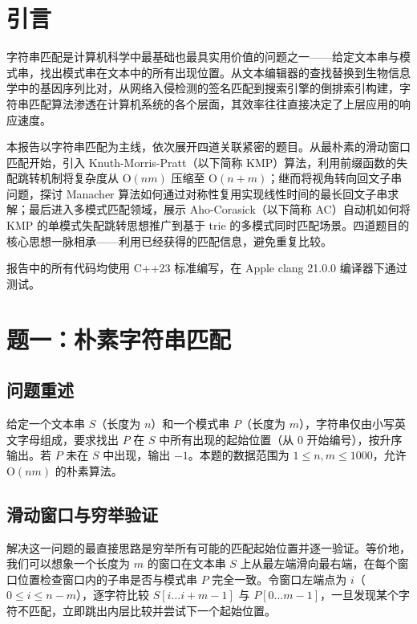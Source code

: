 \documentclass[12pt, a4paper]{academics}
\begin{document}
\makeacademicscover

\section{引言}

字符串匹配是计算机科学中最基础也最具实用价值的问题之一——给定文本串与模式串，找出模式串在文本中的所有出现位置。从文本编辑器的查找替换到生物信息学中的基因序列比对，从网络入侵检测的签名匹配到搜索引擎的倒排索引构建，字符串匹配算法渗透在计算机系统的各个层面，其效率往往直接决定了上层应用的响应速度。

本报告以字符串匹配为主线，依次展开四道关联紧密的题目。从最朴素的滑动窗口匹配开始，引入 Knuth-Morris-Pratt（以下简称 KMP）算法，利用前缀函数的失配跳转机制将复杂度从 $\mathrm{O}(nm)$ 压缩至 $\mathrm{O}(n + m)$；继而将视角转向回文子串问题，探讨 Manacher 算法如何通过对称性复用实现线性时间的最长回文子串求解；最后进入多模式匹配领域，展示 Aho-Corasick（以下简称 AC）自动机如何将 KMP 的单模式失配跳转思想推广到基于 trie 的多模式同时匹配场景。四道题目的核心思想一脉相承——利用已经获得的匹配信息，避免重复比较。

报告中的所有代码均使用 C++23 标准编写，在 Apple clang 21.0.0 编译器下通过测试。

\section{题一：朴素字符串匹配}

\subsection{问题重述}

给定一个文本串 $S$（长度为 $n$）和一个模式串 $P$（长度为 $m$），字符串仅由小写英文字母组成，要求找出 $P$ 在 $S$ 中所有出现的起始位置（从 $0$ 开始编号），按升序输出。若 $P$ 未在 $S$ 中出现，输出 $-1$。本题的数据范围为 $1 \le n, m \le 1000$，允许 $\mathrm{O}(nm)$ 的朴素算法。

\subsection{滑动窗口与穷举验证}

解决这一问题的最直接思路是穷举所有可能的匹配起始位置并逐一验证。等价地，我们可以想象一个长度为 $m$ 的窗口在文本串 $S$ 上从最左端滑向最右端，在每个窗口位置检查窗口内的子串是否与模式串 $P$ 完全一致。令窗口左端点为 $i$（$0 \le i \le n - m$），逐字符比较 $S[i \dots i+m-1]$ 与 $P[0 \dots m-1]$，一旦发现某个字符不匹配，立即跳出内层比较并尝试下一个起始位置。
\end{document}
